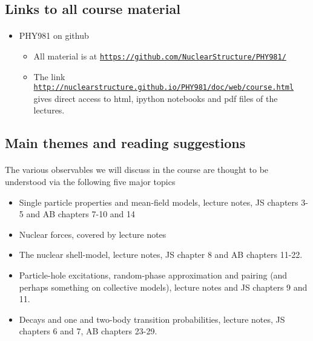\documentclass[%
oneside,                 %
final,                   %
10pt]{article}
\begin{document}
\subsection{Links to all course material}

\paragraph{}
\begin{itemize}
\item PHY981 on github
\begin{itemize}

 \item All material is at  \href{{https://github.com/NuclearStructure/PHY981/}}{\nolinkurl{https://github.com/NuclearStructure/PHY981/}}

 \item The link \href{{http://nuclearstructure.github.io/PHY981/doc/web/course.html}}{\nolinkurl{http://nuclearstructure.github.io/PHY981/doc/web/course.html}} gives direct access to html, ipython notebooks and pdf files of the lectures.
\end{itemize}

\noindent
\end{itemize}

\noindent





\subsection{Main themes and reading suggestions}

\paragraph{}
The various observables we will discuss in the course are thought to be understood via the following five 
major topics
\begin{itemize}
\item Single  particle properties and mean-field models, lecture notes, JS chapters 3-5 and AB chapters 7-10 and 14

\item Nuclear forces, covered by lecture notes

\item The nuclear shell-model, lecture notes, JS chapter 8 and AB chapters 11-22.

\item Particle-hole excitations, random-phase approximation and pairing (and perhaps something on collective models), lecture notes and JS chapters 9 and 11.

\item Decays and one and two-body transition probabilities, lecture notes, JS chapters 6 and 7, AB chapters 23-29.
\end{itemize}
\end{document}

